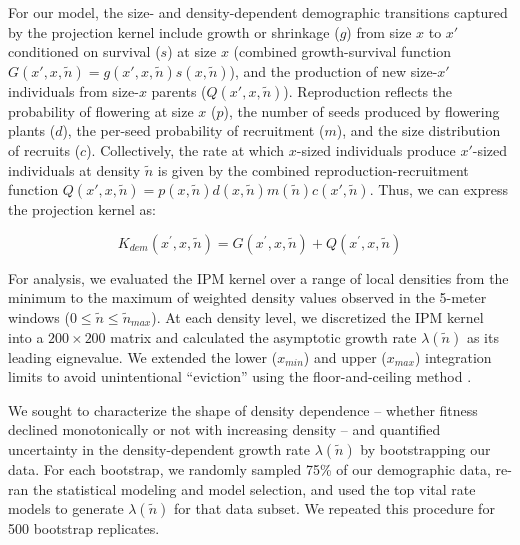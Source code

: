 \documentclass[11pt]{article}\usepackage[]{graphicx}\usepackage[]{color}
\begin{document}
For our model, the size- and density-dependent demographic transitions captured by the projection kernel include growth or shrinkage ($g$) from size $x$ to $x\prime$ conditioned on survival ($s$) at size $x$ (combined growth-survival function $G(x\prime,x,\tilde{n}) = g(x\prime,x,\tilde{n})s(x,\tilde{n})$), and the production of new size-$x\prime$ individuals from size-$x$ parents ($Q(x\prime,x,\tilde{n})$). Reproduction reflects the probability of flowering at size $x$ ($p$), the number of seeds produced by flowering plants ($d$), the per-seed probability of recruitment ($m$), and the size distribution of recruits ($c$). Collectively, the rate at which $x$-sized individuals produce $x\prime$-sized individuals at density $\tilde{n}$ is given by the combined reproduction-recruitment function $Q(x\prime,x,\tilde{n})=p(x,\tilde{n})d(x,\tilde{n})m(\tilde{n})c(x\prime,\tilde{n})$. Thus, we can express the projection kernel as:
\begin{linenomath*} 
\begin{equation}  \label{eq:K}
K_{dem}(x^\prime,x,\tilde{n}) = G(x^\prime,x,\tilde{n}) + Q(x^\prime,x,\tilde{n})
\end{equation} 
\end{linenomath*}
For analysis, we evaluated the IPM kernel over a range of local densities from the minimum to the maximum of weighted density values observed in the 5-meter windows ($0 \leq \tilde{n} \leq \tilde{n}_{max}$). 
At each density level, we discretized the IPM kernel into a $200 \times 200$ matrix and calculated the asymptotic growth rate $\lambda(\tilde{n})$ as its leading eignevalue. 
We extended the lower ($x_{min}$) and upper ($x_{max}$) integration limits to avoid unintentional ``eviction'' using the floor-and-ceiling method \citep{williams2012avoiding}.

We sought to characterize the shape of density dependence -- whether fitness declined monotonically or not with increasing density -- and quantified uncertainty in the density-dependent growth rate $\lambda(\tilde{n})$ by bootstrapping our data. 
For each bootstrap, we randomly sampled 75\% of our demographic data, re-ran the statistical modeling and model selection, and used the top vital rate models to generate $\lambda(\tilde{n})$ for that data subset. 
We repeated this procedure for 500 bootstrap replicates. 
\end{document}
